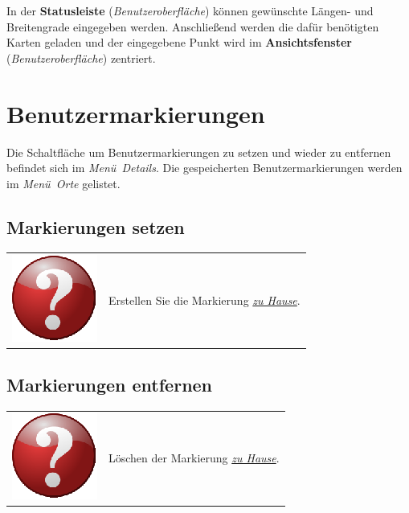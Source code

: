 \documentclass[10pt]{scrreprt}
\newcommand{\textref}[1]{\mbox{\raisebox{0.1ex}{\small$\rightarrow$ }\textit{#1}}}
\begin{document}
In der \textbf{Statusleiste} (\textref{Benutzeroberfläche}) können gewünschte Längen- und Breitengrade eingegeben werden. Anschließend werden die dafür benötigten Karten geladen und der eingegebene Punkt wird im \textbf{Ansichtsfenster} (\textref{Benutzeroberfläche}) zentriert.



\vspace{3mm}
\section{Benutzermarkierungen} 
Die Schaltfläche um Benutzermarkierungen zu setzen und wieder zu entfernen befindet sich im \textref{Menü Details}. Die gespeicherten Benutzermarkierungen werden im \textref{Menü Orte} gelistet.





\vspace{3mm}
\subsection{Markierungen setzen}  



\vspace{3mm}
\begin{tabular}{>{\centering \arraybackslash}m{1cm} m{14cm}}
\includegraphics[scale=0.5]{images/quest.eps} & Erstellen Sie die Markierung  \underline{\textit{zu Hause}}.
\end{tabular}



\vspace{3mm}
\subsection{Markierungen entfernen}  

\vspace{3mm}
\begin{tabular}{>{\centering \arraybackslash}m{1cm} m{14cm}}
\includegraphics[scale=0.5]{images/quest.eps} & Löschen der Markierung \underline{\textit{zu Hause}}.
\end{tabular}
\end{document}
